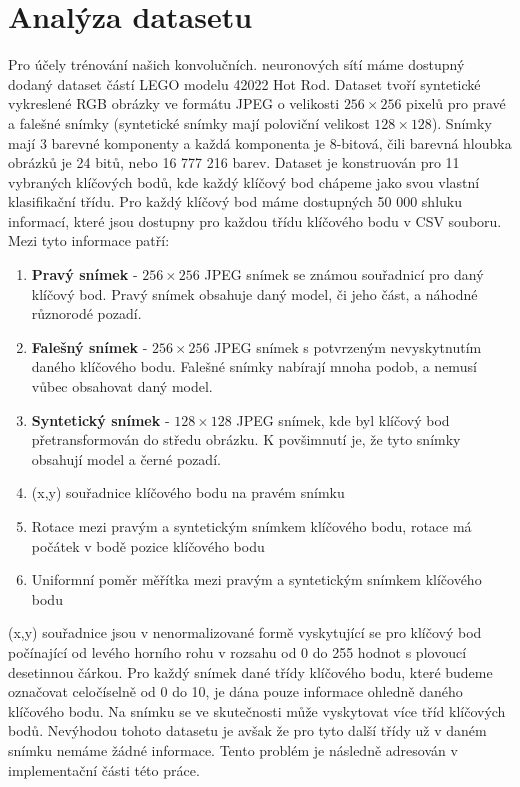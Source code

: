 \section{Analýza datasetu}
\label{sec:Chapter31}
Pro účely trénování našich konvolučních. neuronových sítí máme dostupný dodaný dataset částí LEGO modelu 42022 Hot Rod. Dataset tvoří syntetické vykreslené RGB obrázky ve formátu JPEG o velikosti $256\times256$ pixelů pro pravé a falešné snímky (syntetické snímky mají poloviční velikost $128\times128$). Snímky mají 3 barevné komponenty a každá komponenta je 8-bitová, čili barevná hloubka obrázků je 24 bitů, nebo 16 777 216 barev. Dataset je konstruován pro 11 vybraných klíčových bodů, kde každý klíčový bod chápeme jako svou vlastní klasifikační třídu. Pro každý klíčový bod máme dostupných 50 000 shluku informací, které jsou dostupny pro každou třídu klíčového bodu v CSV souboru. Mezi tyto informace patří:
\begin{enumerate}
  \item \textbf{Pravý snímek} - $256\times256$ JPEG snímek se známou souřadnicí pro daný klíčový bod. Pravý snímek obsahuje daný model, či jeho část, a náhodné různorodé pozadí.
  \item \textbf{Falešný snímek} - $256\times256$ JPEG snímek s potvrzeným nevyskytnutím daného klíčového bodu. Falešné snímky nabírají mnoha podob, a nemusí vůbec obsahovat daný model.
  \item \textbf{Syntetický snímek} - $128\times128$ JPEG snímek, kde byl klíčový bod přetransformován do středu obrázku. K povšimnutí je, že tyto snímky obsahují model a černé pozadí.
  \item (x,y) souřadnice klíčového bodu na pravém snímku
  \item Rotace mezi pravým a syntetickým snímkem klíčového bodu, rotace má počátek v bodě pozice klíčového bodu
  \item Uniformní poměr měřítka mezi pravým a syntetickým snímkem klíčového bodu
\end{enumerate}

(x,y) souřadnice jsou v nenormalizované formě vyskytující se pro klíčový bod počínající od levého horního rohu v rozsahu od 0 do 255 hodnot s plovoucí desetinnou čárkou. Pro každý snímek dané třídy klíčového bodu, které budeme označovat celočíselně od 0 do 10, je dána pouze informace ohledně daného klíčového bodu. Na snímku se ve skutečnosti může vyskytovat více tříd klíčových bodů. Nevýhodou tohoto datasetu je avšak že pro tyto další třídy už v daném snímku nemáme žádné informace. Tento problém je následně adresován v implementační části této práce.



